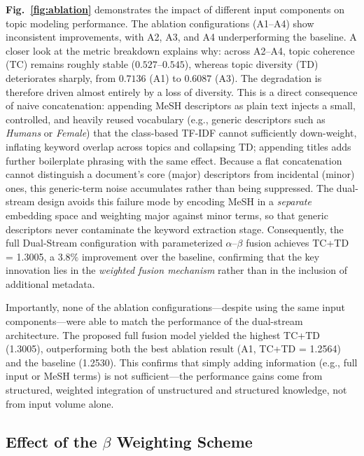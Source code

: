 \documentclass[authorproof,JACIII,researchpaper]{fujipressarticle}
\begin{document}
\textbf{Fig.~\ref{fig:ablation}} demonstrates the impact of different input components on topic modeling performance. The ablation configurations (A1--A4) show inconsistent improvements, with A2, A3, and A4 underperforming the baseline. A closer look at the metric breakdown explains why: across A2--A4, topic coherence (TC) remains roughly stable ($0.527$--$0.545$), whereas topic diversity (TD) deteriorates sharply, from $0.7136$ (A1) to $0.6087$ (A3). The degradation is therefore driven almost entirely by a loss of diversity. This is a direct consequence of naive concatenation: appending MeSH descriptors as plain text injects a small, controlled, and heavily reused vocabulary (e.g., generic descriptors such as \textit{Humans} or \textit{Female}) that the class-based TF-IDF cannot sufficiently down-weight, inflating keyword overlap across topics and collapsing TD; appending titles adds further boilerplate phrasing with the same effect. Because a flat concatenation cannot distinguish a document's core (major) descriptors from incidental (minor) ones, this generic-term noise accumulates rather than being suppressed. The dual-stream design avoids this failure mode by encoding MeSH in a \emph{separate} embedding space and weighting major against minor terms, so that generic descriptors never contaminate the keyword extraction stage. Consequently, the full Dual-Stream configuration with parameterized $\alpha$--$\beta$ fusion achieves TC+TD = 1.3005, a $3.8\%$ improvement over the baseline, confirming that the key innovation lies in the \emph{weighted fusion mechanism} rather than in the inclusion of additional metadata.

Importantly, none of the ablation configurations---despite using the same input components---were able to match the performance of the dual-stream architecture. The proposed full fusion model yielded the highest TC+TD (1.3005), outperforming both the best ablation result (A1, TC+TD = 1.2564) and the baseline (1.2530). This confirms that simply adding information (e.g., full input or MeSH terms) is not sufficient---the performance gains come from structured, weighted integration of unstructured and structured knowledge, not from input volume alone.

\subsection{Effect of the $\beta$ Weighting Scheme}
\label{subsec:beta_norm}
\end{document}
